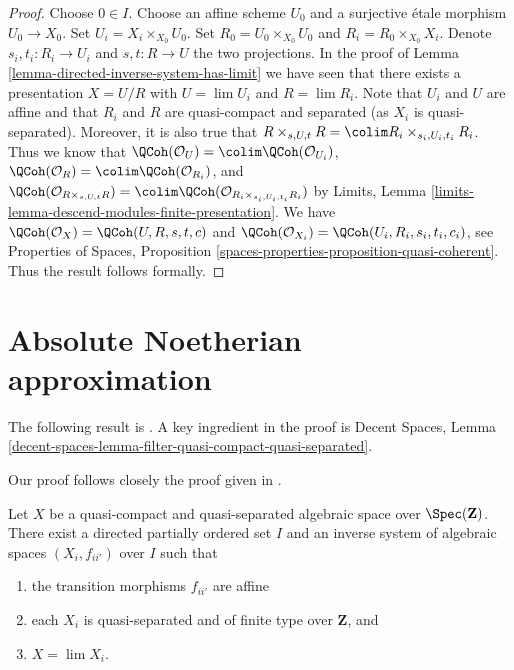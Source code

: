 \begin{proof}
Choose $0 \in I$. Choose an affine scheme $U_0$ and a surjective
\'etale morphism $U_0 \to X_0$. Set $U_i = X_i \times_{X_0} U_0$.
Set $R_0 = U_0 \times_{X_0} U_0$ and $R_i = R_0 \times_{X_0} X_i$.
Denote $s_i, t_i : R_i \to U_i$ and $s, t : R \to U$ the two
projections. In the proof of
Lemma \ref{lemma-directed-inverse-system-has-limit} we have
seen that there exists a presentation $X = U/R$ with
$U = \lim U_i$ and $R = \lim R_i$. Note that $U_i$ and $U$ are affine and
that $R_i$ and $R$ are quasi-compact and separated (as $X_i$ is
quasi-separated). Moreover, it is also true that
$R \times_{s, U, t} R = \colim R_i \times_{s_i, U_i, t_i} R_i$.
Thus we know that
$\QCoh(\mathcal{O}_U) = \colim \QCoh(\mathcal{O}_{U_i})$,
$\QCoh(\mathcal{O}_R) = \colim \QCoh(\mathcal{O}_{R_i})$,
and
$\QCoh(\mathcal{O}_{R \times_{s, U, t} R}) =
\colim \QCoh(\mathcal{O}_{R_i \times_{s_i, U_i, t_i} R_i})$ by
Limits, Lemma \ref{limits-lemma-descend-modules-finite-presentation}.
We have $\QCoh(\mathcal{O}_X) = \QCoh(U, R, s, t, c)$ and
$\QCoh(\mathcal{O}_{X_i}) = \QCoh(U_i, R_i, s_i, t_i, c_i)$,
see Properties of Spaces, Proposition
\ref{spaces-properties-proposition-quasi-coherent}.
Thus the result follows formally.
\end{proof}














\section{Absolute Noetherian approximation}
\label{section-approximation}

\noindent
The following result is \cite[Theorem 1.2.2]{CLO}.
A key ingredient in the proof is
Decent Spaces, Lemma
\ref{decent-spaces-lemma-filter-quasi-compact-quasi-separated}.

\begin{proposition}
\label{proposition-approximate}
\begin{reference}
Our proof follows closely the proof given in \cite[Theorem 1.2.2]{CLO}.
\end{reference}
Let $X$ be a quasi-compact and quasi-separated algebraic space over
$\Spec(\mathbf{Z})$. There exist a directed partially ordered set $I$
and an inverse system of algebraic spaces $(X_i, f_{ii'})$ over $I$
such that
\begin{enumerate}
\item the transition morphisms $f_{ii'}$ are affine
\item each $X_i$ is quasi-separated and of finite type over
$\mathbf{Z}$, and
\item $X = \lim X_i$.
\end{enumerate}
\end{proposition}

